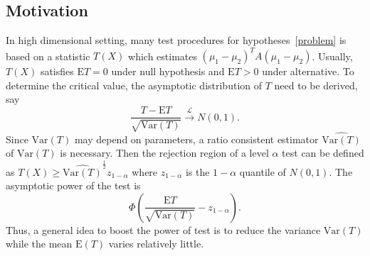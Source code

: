 \documentclass[review]{elsarticle}
\theoremstyle{plain}
\theoremstyle{definition}
\theoremstyle{remark}
\begin{document}
\subsection{Motivation}
 In high dimensional setting, many test procedures for hypotheses~\eqref{problem} is based on a statistic $T(X)$ which estimates ${(\mu_1-\mu_2)}^T A(\mu_1-\mu_2)$.
 Usually, $T(X)$ satisfies $\mathrm{E}T=0$ under null hypothesis and $\mathrm{E}T> 0$  under alternative.
 To determine the critical value, the asymptotic distribution of $T$ need to be derived, say 
 $$\frac{T-\textrm{E}T}{\sqrt{\textrm{Var}(T)}}\xrightarrow{\mathcal{L}} N(0,1).$$
 Since $\textrm{Var}(T)$ may depend on parameters, a ratio consistent estimator $\widehat{\textrm{Var}(T)}$ of $\textrm{Var}(T)$ is necessary. Then
 the rejection region of a level $\alpha$ test can be defined as $T(X)\geq \widehat{\textrm{Var}(T)}^{\frac{1}{2}}z_{1-\alpha}$ where $z_{1-\alpha}$ is the $1-\alpha$ quantile of $N(0,1)$. 
The asymptotic power of the test is 
$$\Phi(\frac{\mathrm{E}T}{\sqrt{\mathrm{Var}(T)}}-z_{1-\alpha}).$$
Thus, a general idea to boost the power of test is to reduce the variance $\mathrm{Var}(T)$ while the mean $\mathrm{E}(T)$ varies relatively little.
\end{document}
